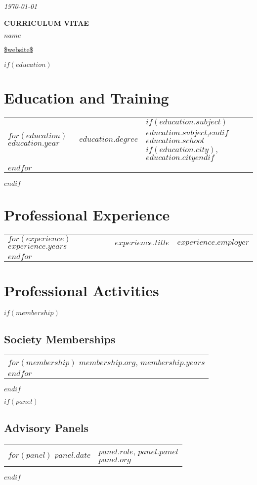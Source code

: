 \documentclass[martgin, line]{article}
\begin{document}
\begin{flushright}
  \textit{\today}
\end{flushright}

\begin{center}
  \textbf{CURRICULUM VITAE}

  \vspace{0.5cm}
  {\LARGE \textbf{$name$}}
  
  \vspace{0.1cm}
  \url{$website$}
\end{center}


$if(education)$
\section*{Education and Training}
\noindent
\begin{tabular}{lll}
$for(education)$
$education.year$&$education.degree$&
$if(education.subject)$$education.subject$,$endif$
$education.school$$if(education.city)$, $education.city$$endif$\\
$endfor$
\end{tabular}
$endif$

\section*{Professional Experience}
\noindent
\begin{tabular}{lll}
$for(experience)$
$experience.years$&
$experience.title$&
$experience.employer$\\
$endfor$
\end{tabular}

\section*{Professional Activities}

$if(membership)$
\subsection*{Society Memberships}
\begin{tabular}{l}
$for(membership)$
$membership.org$, $membership.years$\\
$endfor$
\end{tabular}
$endif$

$if(panel)$
\subsection*{Advisory Panels}
\setlength{\extrarowheight}{.75em}
\begin{tabular}{lp{5.5in}}   
$for(panel)$
$panel.date$&
\parbox[t]{5.5in}{$panel.role$, $panel.panel$\\
  \textit{$panel.org$}}\\
$endfor$
\end{tabular}
\setlength{\extrarowheight}{0em}
$endif$
\end{document}
